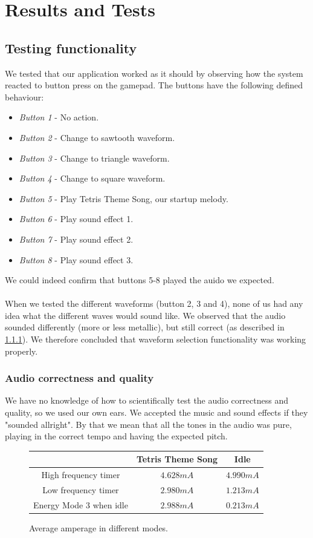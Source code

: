 \section{Results and Tests}

\subsection{Testing functionality}
We tested that our application worked as it should by observing how the system reacted to button press on the gamepad. The buttons have the following defined behaviour:
\begin{itemize}
	\item \emph{Button 1} - No action. 
	\item \emph{Button 2} - Change to sawtooth waveform.
	\item \emph{Button 3} - Change to triangle waveform.
	\item \emph{Button 4} - Change to square waveform.
	\item \emph{Button 5} - Play Tetris Theme Song, our startup melody.
	\item \emph{Button 6} - Play sound effect 1.
	\item \emph{Button 7} - Play sound effect 2.
	\item \emph{Button 8} - Play sound effect 3.
\end{itemize}

We could indeed confirm that buttons 5-8 played the auido we expected. \\
\\
When we tested the different waveforms (button 2, 3 and 4), none of us had any idea what the different waves would sound like. We observed that the audio sounded differently (more or less metallic), but still correct (as described in \ref{audio_correctness}). We therefore concluded that waveform selection functionality was working properly.

\subsubsection{Audio correctness and quality}
\label{audio_correctness}
We have no knowledge of how to scientifically test the audio correctness and quality, so we used our own ears. We accepted the music and sound effects if they "sounded allright". By that we mean that all the tones in the audio was pure, playing in the correct tempo and having the expected pitch. 

\begin{figure}[h]
	\centering
	\begin{tabular}{c | c  c}
			& Tetris Theme Song & Idle \\
		\hline
		\hline
		High frequency timer & $4.628mA$ & $4.990mA$ \\
		Low frequency timer & $2.980mA$ & $1.213mA$ \\
		Energy Mode 3 when idle & $2.988mA$ & $0.213mA$ \\

	\end{tabular}
	\caption{Average amperage in different modes.}
	\label{fig:energy_results}

\end{figure}

